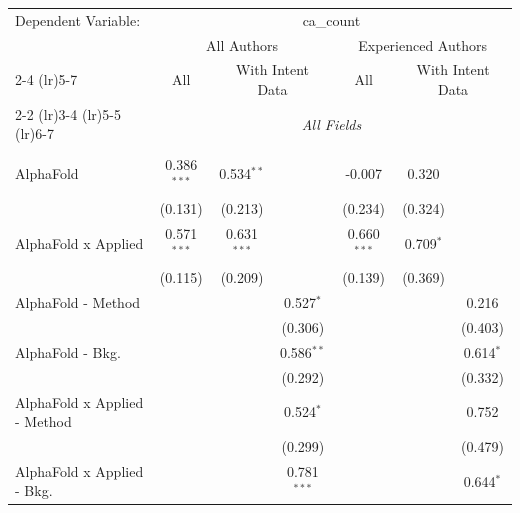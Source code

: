 \begingroup
\centering
\begin{tabular}{lcccccc}
   \tabularnewline \midrule \midrule
   Dependent Variable: & \multicolumn{6}{c}{ca\_count}\\
 & \multicolumn{3}{c}{All Authors} & \multicolumn{3}{c}{Experienced Authors} \\
\cmidrule(lr){2-4} \cmidrule(lr){5-7}
 & \multicolumn{1}{c}{All} & \multicolumn{2}{c}{With Intent Data} & \multicolumn{1}{c}{All} & \multicolumn{2}{c}{With Intent Data} \\
\cmidrule(lr){2-2} \cmidrule(lr){3-4} \cmidrule(lr){5-5} \cmidrule(lr){6-7}
 & \multicolumn{6}{c}{\textit{All Fields}} \\ \\
   AlphaFold                      & 0.386$^{***}$ & 0.534$^{**}$  &               & -0.007        & 0.320         &   \\   
                                  & (0.131)       & (0.213)       &               & (0.234)       & (0.324)       &   \\   
   AlphaFold x Applied            & 0.571$^{***}$ & 0.631$^{***}$ &               & 0.660$^{***}$ & 0.709$^{*}$   &   \\   
                                  & (0.115)       & (0.209)       &               & (0.139)       & (0.369)       &   \\   
   AlphaFold - Method             &               &               & 0.527$^{*}$   &               &               & 0.216\\   
                                  &               &               & (0.306)       &               &               & (0.403)\\   
   AlphaFold - Bkg.               &               &               & 0.586$^{**}$  &               &               & 0.614$^{*}$\\   
                                  &               &               & (0.292)       &               &               & (0.332)\\   
   AlphaFold x Applied - Method   &               &               & 0.524$^{*}$   &               &               & 0.752\\   
                                  &               &               & (0.299)       &               &               & (0.479)\\   
   AlphaFold x Applied - Bkg.     &               &               & 0.781$^{***}$ &               &               & 0.644$^{*}$\\   

\end{tabular}
